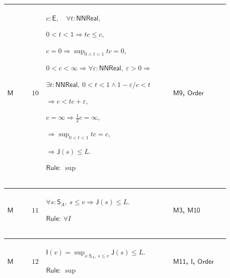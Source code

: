 \documentclass[12pt,reqno]{amsart}
\theoremstyle{blueplain}
\numberwithin{equation}{section}
\begin{document}
{\scriptsize \setlength{\parskip}{0pt}\nointerlineskip
\noindent 
\begin{tabular}{|@{}>{\centering\arraybackslash}m{0.10658\linewidth}|>{\centering\arraybackslash}m{0.03553\linewidth}|>{\centering\arraybackslash}m{0.52105\linewidth}|>{\centering\arraybackslash}m{0.23684\linewidth}|}
\hline
\hypertarget{proof:M10}{$\displaystyle \mathsf{M}$} & $\displaystyle 10$ & $%
\displaystyle c:\mathsf{E},\quad\forall t:\mathsf{NNReal},$\par$%
\displaystyle 0<t<1\Rightarrow tc\le c,$\par$\displaystyle %
c=0\Rightarrow\sup_{0<t<1}tc=0,$\par$\displaystyle 0<c<\infty\Rightarrow%
\forall\varepsilon:\mathsf{NNReal},\ \varepsilon>0\Rightarrow$\par$%
\displaystyle \exists t:\mathsf{NNReal},\ 0<t<1\land1-\varepsilon/c<t$\par$%
\displaystyle \Rightarrow c<tc+\varepsilon,$\par$\displaystyle %
c=\infty\Rightarrow\tfrac12c=\infty,$\par$\displaystyle \Rightarrow%
\sup_{0<t<1}tc=c,$\par$\displaystyle \Rightarrow\mathsf{J}(s)\le L.$\par$%
\displaystyle \mathsf{Rule}:\ \sup$ & \hyperlink{proof:M9}{$\displaystyle 
\mathsf{M9}$}, \hyperlink{ax:Order}{$\displaystyle \mathsf{Order}$} \\ \hline
\end{tabular}%
}

{\scriptsize \setlength{\parskip}{0pt}\nointerlineskip
\noindent 
\begin{tabular}{|@{}>{\centering\arraybackslash}m{0.10658\linewidth}|>{\centering\arraybackslash}m{0.03553\linewidth}|>{\centering\arraybackslash}m{0.52105\linewidth}|>{\centering\arraybackslash}m{0.23684\linewidth}|}
\hline
\hypertarget{proof:M11}{$\displaystyle \mathsf{M}$} & $\displaystyle 11$ & $%
\displaystyle \forall s:\mathsf{S}_A,\ s\le v\Rightarrow\mathsf{J}(s)\le L.$%
\par$\displaystyle \mathsf{Rule}:\ \forall I$ & \hyperlink{proof:M3}{$%
\displaystyle \mathsf{M3}$}, \hyperlink{proof:M10}{$\displaystyle \mathsf{M10%
}$} \\ \hline
\end{tabular}%
}

{\scriptsize \setlength{\parskip}{0pt}\nointerlineskip
\noindent 
\begin{tabular}{|@{}>{\centering\arraybackslash}m{0.10658\linewidth}|>{\centering\arraybackslash}m{0.03553\linewidth}|>{\centering\arraybackslash}m{0.52105\linewidth}|>{\centering\arraybackslash}m{0.23684\linewidth}|}
\hline
\hypertarget{proof:M12}{$\displaystyle \mathsf{M}$} & $\displaystyle 12$ & $%
\displaystyle \mathsf{I}(v)=\sup_{s:\mathsf{S}_A,\ s\le v}\mathsf{J}(s)\le L.
$\par$\displaystyle \mathsf{Rule}:\ \sup$ & \hyperlink{proof:M11}{$%
\displaystyle \mathsf{M11}$}, \hyperlink{def:I}{$\displaystyle \mathsf{I}$}, 
\hyperlink{ax:Order}{$\displaystyle \mathsf{Order}$} \\ \hline
\end{tabular}%
}
\end{document}
